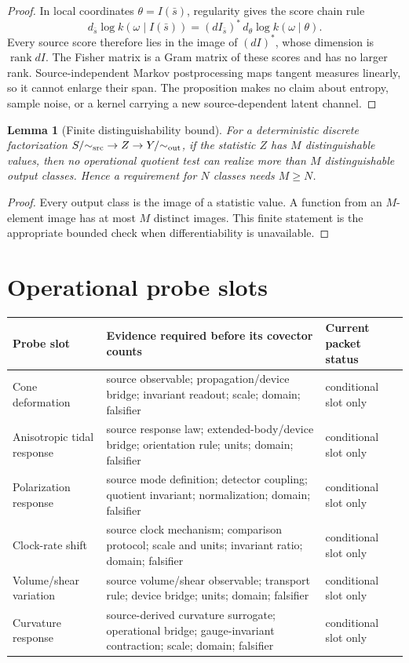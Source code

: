 \documentclass[11pt]{article}
\newtheorem{lemma}{Lemma}
\newcommand{\rank}{\operatorname{rank}}
\begin{document}
\begin{proof}
In local coordinates \(\theta=I(\bar s)\), regularity gives the score chain
rule
\[
 d_{\bar s}\log k(\omega\mid I(\bar s))
   =(dI_{\bar s})^{\!*}\,
     d_\theta\log k(\omega\mid\theta).
\]
Every source score therefore lies in the image of \((dI)^{\!*}\), whose
dimension is \(\rank dI\).  The Fisher matrix is a Gram matrix of these scores
and has no larger rank.  Source-independent Markov postprocessing maps tangent
measures linearly, so it cannot enlarge their span.  The proposition makes no
claim about entropy, sample noise, or a kernel carrying a new
source-dependent latent channel.
\end{proof}

\begin{lemma}[Finite distinguishability bound]
\label{lem:finite}
For a deterministic discrete factorization \(S/{\sim_{\rm src}}\to Z\to
Y/{\sim_{\rm out}}\), if the statistic \(Z\) has \(M\) distinguishable values,
then no operational quotient test can realize more than \(M\) distinguishable
output classes.  Hence a requirement for \(N\) classes needs \(M\geq N\).
\end{lemma}

\begin{proof}
Every output class is the image of a statistic value.  A function from an
\(M\)-element image has at most \(M\) distinct images.  This finite statement
is the appropriate bounded check when differentiability is unavailable.
\end{proof}

\section{Operational probe slots}

\begin{longtable}{p{}p{}p{}}
\toprule
Probe slot & Evidence required before its covector counts & Current packet status\\
\midrule
Cone deformation & source observable; propagation/device bridge; invariant
readout; scale; domain; falsifier & conditional slot only\\
Anisotropic tidal response & source response law; extended-body/device bridge;
orientation rule; units; domain; falsifier & conditional slot only\\
Polarization response & source mode definition; detector coupling; quotient
invariant; normalization; domain; falsifier & conditional slot only\\
Clock-rate shift & source clock mechanism; comparison protocol; scale and
units; invariant ratio; domain; falsifier & conditional slot only\\
Volume/shear variation & source volume/shear observable; transport rule;
device bridge; units; domain; falsifier & conditional slot only\\
Curvature response & source-derived curvature surrogate; operational bridge;
gauge-invariant contraction; scale; domain; falsifier & conditional slot only\\
\bottomrule
\end{longtable}
\end{document}
